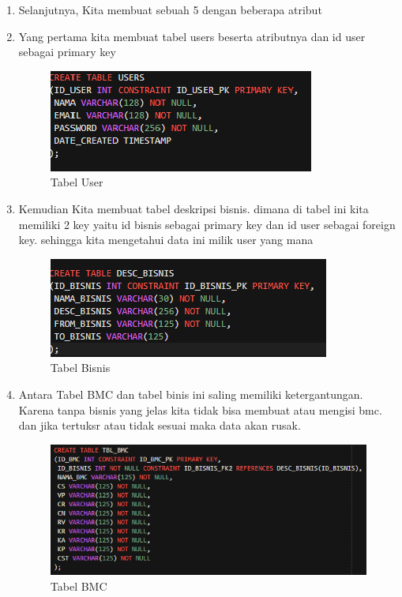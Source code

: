\begin{enumerate}
\item Selanjutnya, Kita membuat sebuah 5 dengan beberapa atribut 
\item Yang pertama kita membuat tabel users beserta atributnya dan id user sebagai primary key
\begin{figure}[H]
\centering
\caption{Tabel User}
\includegraphics[witdh=1\textwidth]{figures/25.png}
\end{figure}

\item Kemudian Kita membuat tabel deskripsi bisnis. dimana di tabel ini kita memiliki 2 key yaitu id bisnis sebagai primary key dan id user sebagai foreign key. sehingga kita mengetahui data ini milik user yang mana
\begin{figure}[H]
\centering
\caption{Tabel Bisnis}
\includegraphics[witdh=1\textwidth]{figures/26.png}
\end{figure}

\item Antara Tabel BMC dan tabel binis ini saling memiliki ketergantungan. Karena tanpa bisnis yang jelas kita tidak bisa membuat atau mengisi bmc. dan jika tertuksr atau tidak sesuai maka data akan rusak.
\begin{figure}[H]
\centering
\caption{Tabel BMC}
\includegraphics[witdh=1\textwidth]{figures/27.png}
\end{figure}


\end{enumerate}
